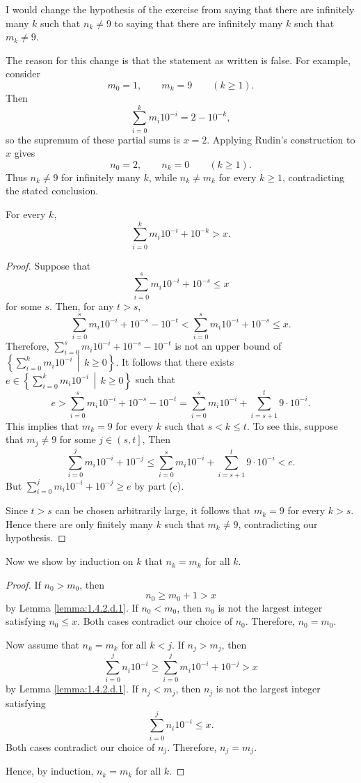 \documentclass[../../../main.tex]{subfiles}
\begin{document}

I would change the hypothesis of the exercise from saying that there are
infinitely many $k$ such that $n_k\neq 9$ to saying that there are
infinitely many $k$ such that $m_k\neq 9$.

The reason for this change is that the statement as written is false.
For example, consider
\[
m_0=1,\qquad m_k=9\qquad (k\geq 1).
\]
Then
\[
\sum_{i=0}^k m_i10^{-i}=2-10^{-k},
\]
so the supremum of these partial sums is $x=2$. Applying Rudin's
construction to $x$ gives
\[
n_0=2,\qquad n_k=0\qquad (k\geq 1).
\]
Thus $n_k\neq 9$ for infinitely many $k$, while $n_k\neq m_k$ for every
$k\geq 1$, contradicting the stated conclusion.

\begin{lemma}
\label{lemma:1.4.2.d.1}

    For every $k$,
    \[
        \sum_{i=0}^{k} m_i 10^{-i} + 10^{-k} > x.
    \]
\end{lemma}

\begin{proof}
	Suppose that
	\[
		\sum_{i=0}^{s} m_i 10^{-i} + 10^{-s} \leq x
	 \]
	for some $s$.
	Then, for any $t > s$,
	\[ 
		\sum_{i=0}^{s} m_i 10^{-i} + 10^{-s} - 10^{-t} < \sum_{i=0}^{s} m_i 10^{-i} + 10^{-s} \leq x.
	 \]
	Therefore, $\sum_{i=0}^{s} m_i 10^{-i} + 10^{-s} - 10^{-t}$ is not an upper bound of $\left\{ \sum_{i=0}^{k} m_i 10^{-i} \, \middle |\, k \ge 0 \right\}$.
	It follows that there exists $e \in \left\{ \sum_{i=0}^{k} m_i 10^{-i} \, \middle |\, k \ge 0 \right\}$ such that
	\[ 
		e > \sum_{i=0}^{s} m_i 10^{-i} + 10^{-s} - 10^{-t} = \sum_{i=0}^{s} m_i 10^{-i} + \sum_{i=s+1}^{t} 9 \cdot 10^{-i}.
	 \]
	This implies that $m_k = 9$ for every $k$ such that $s < k \leq t$.
		To see this, suppose that $m_j \neq 9$ for some $j \in \left(s, t\right]$,
	Then
	\[ 
		\sum_{i=0}^{j} m_i 10^{-i} + 10^{-j} \leq \sum_{i=0}^{s} m_i 10^{-i} + \sum_{i=s+1}^{t} 9 \cdot 10^{-i} < e.
	 \]
	But $\sum_{i=0}^{j} m_i 10^{-i} + 10^{-j} \geq e$ by part (c).

	Since $t > s$ can be chosen arbitrarily large, it follows that $m_k = 9$ for every $k > s$. Hence there are only finitely many $k$ such that $m_k \neq 9$, contradicting our hypothesis.
\end{proof}

Now we show by induction on $k$ that $n_k = m_k$ for all $k$.

\begin{proof}
	If $n_0 > m_0$, then
	\[
		n_0 \geq m_0 + 1 > x
	\]
	by Lemma \ref{lemma:1.4.2.d.1}.
	If $n_0 < m_0$, then $n_0$ is not the largest integer satisfying $n_0 \leq x$.
	Both cases contradict our choice of $n_0$. Therefore, $n_0 = m_0$.

	Now assume that $n_k = m_k$ for all $k < j$.
	If $n_j > m_j$, then
	\[
		\sum_{i=0}^{j} n_i 10^{-i}
		\geq
		\sum_{i=0}^{j} m_i 10^{-i} + 10^{-j}
		> x
	\]
	by Lemma \ref{lemma:1.4.2.d.1}.
	If $n_j < m_j$, then $n_j$ is not the largest integer satisfying
	\[
		\sum_{i=0}^{j} n_i 10^{-i} \leq x.
	\]
	Both cases contradict our choice of $n_j$. Therefore, $n_j = m_j$.

	Hence, by induction, $n_k = m_k$ for all $k$.
\end{proof}
\end{document}
